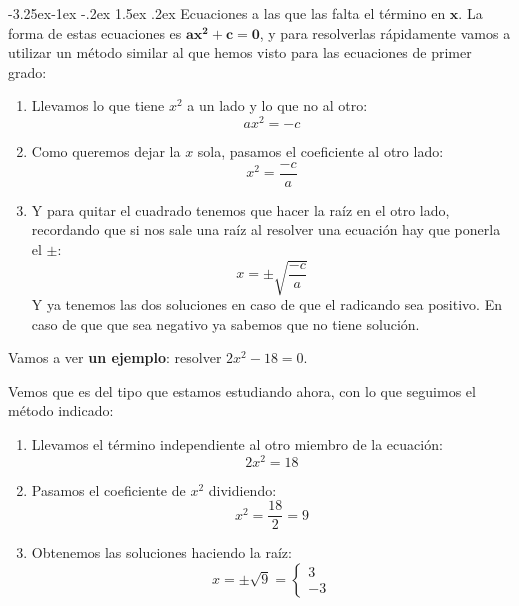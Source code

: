 \documentclass[a4paper,11pt,answers]{exam}
\makeatletter
\renewcommand\paragraph{\@startsection{paragraph}{4}{\z@}%
                                     {-3.25ex\@plus -1ex \@minus -.2ex}%
                                     {1.5ex \@plus .2ex}%
                                     {\normalfont\normalsize\bfseries}}
\makeatother
\begin{document}
  \paragraph{Ecuaciones a las que las falta el término en $\boldsymbol{x}$}.
    La forma de estas ecuaciones es $\boldsymbol{ax^2 + c = 0}$, y para resolverlas rápidamente vamos a utilizar un método similar al que hemos visto para las ecuaciones de primer grado:
    \begin{enumerate}
    \item Llevamos lo que tiene $x^2$ a un lado y lo que no al otro:
      \[ax^2 = -c\]
    \item Como queremos dejar la $x$ sola, pasamos el coeficiente al otro lado:
      \[x^2 = \frac{-c}{a}\]
    \item Y para quitar el cuadrado tenemos que hacer la raíz en el otro lado, recordando que si nos sale una raíz al resolver una ecuación hay que ponerla el $\pm$:
      \[x= \pm \sqrt{\frac{-c}{a}}\]
      Y ya tenemos las dos soluciones en caso de que el radicando sea positivo. En caso de que que sea negativo ya sabemos que no tiene solución.
    \end{enumerate}
    Vamos a ver \textbf{un ejemplo}: resolver $2x^2 - 18 = 0$.
    \begin{solution}   
      Vemos que es del tipo que estamos estudiando ahora, con lo que seguimos el método indicado:
      \begin{enumerate}
      \item Llevamos el término independiente al otro miembro de la ecuación:
        \[2x^2 = 18\]
      \item Pasamos el coeficiente de $x^2$ dividiendo:
        \[x^2 = \frac{18}{2} = 9\]
      \item Obtenemos las soluciones haciendo la raíz:
        \[x = \pm \sqrt{9} =
          \begin{cases}   
            3\\-3
          \end{cases}\]
        
      \end{enumerate}
      
    \end{solution}
    
\end{document}
